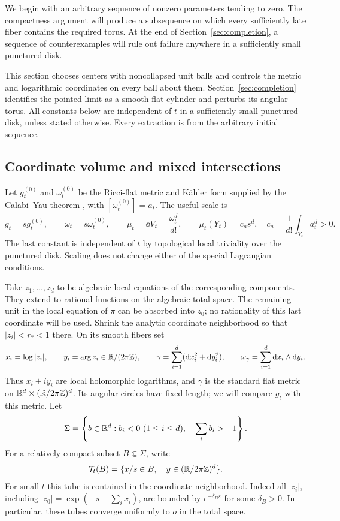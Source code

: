 We begin with an arbitrary sequence of nonzero parameters tending to zero.
The compactness argument will produce a subsequence on which every
sufficiently late fiber contains the required torus.  At the end of
Section~\ref{sec:completion}, a sequence of counterexamples will rule out
failure anywhere in a sufficiently small punctured disk.

This section chooses centers with noncollapsed unit balls and controls
the metric and logarithmic coordinates on every ball about them.
Section~\ref{sec:completion} identifies the pointed limit as a smooth
flat cylinder and perturbs its angular torus.  All constants below are
independent of $t$ in a sufficiently small punctured disk, unless stated
otherwise.  Every extraction is from the arbitrary initial sequence.

\subsection{Coordinate volume and mixed intersections}

Let $g_t^{(0)}$ and $\omega_t^{(0)}$ be the Ricci-flat metric and K\"ahler
form supplied by the Calabi--Yau theorem \cite{Yau}, with
$[\omega_t^{(0)}]=a_t$.  The useful scale is
\begin{equation}
 g_t=s g_t^{(0)},\qquad \omega_t=s\omega_t^{(0)},\qquad
 \mu_t=\dd V_t=\frac{\omega_t^d}{d!},\qquad
 \mu_t(Y_t)=c_a s^d,
 \quad c_a=\frac1{d!}\int_{Y_t}a_t^d>0.
 \label{eq:torus-scaling}
\end{equation}
The last constant is independent of $t$ by topological local triviality
over the punctured disk.  Scaling does not change either of the special
Lagrangian conditions.

Take $z_1,\ldots,z_d$ to be algebraic local equations of the corresponding
components.  They extend to rational functions on the algebraic total
space.  The remaining unit in the local equation of $\pi$ can be absorbed
into $z_0$; no rationality of this last coordinate will be used.  Shrink
the analytic coordinate neighborhood so that $|z_i|<r_*<1$ there.  On its
smooth fibers set
\[
 x_i=\log|z_i|,\qquad y_i=\arg z_i\in\mathbb R/(2\pi\mathbb Z),\qquad
 \gamma=\sum_{i=1}^d(\mathrm d x_i^2+\mathrm d y_i^2),\qquad
 \omega_\gamma=\sum_{i=1}^d\mathrm d x_i\wedge\mathrm d y_i.
\]
Thus $x_i+iy_i$ are local holomorphic logarithms, and $\gamma$ is the
standard flat metric on $\mathbb R^d\times(\mathbb R/2\pi\mathbb Z)^d$.  Its angular
circles have fixed length; we will compare $g_t$ with this metric.
Let
\[
 \Sigma=\left\{b\in\mathbb R^d:b_i<0\ (1\le i\le d),\quad
                              \sum_i b_i>-1\right\}.
\]
For a relatively compact subset $B\Subset\Sigma$, write
\[
 \mathcal T_t(B)=\{x/s\in B,\quad y\in(\mathbb R/2\pi\mathbb Z)^d\}.
\]
For small $t$ this tube is contained in the coordinate neighborhood.
Indeed all $|z_i|$, including
$|z_0|=\exp(-s-\sum_i x_i)$, are bounded by $e^{-\delta_B s}$
for some $\delta_B>0$.  In particular, these tubes converge uniformly to
$o$ in the total space.

